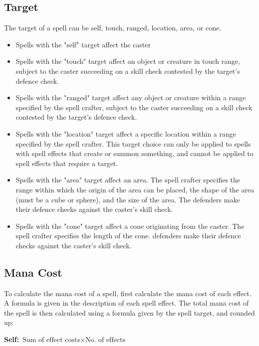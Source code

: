 \begin{multicols*}{2}
    \subsection{Target}
    The target of a spell can be self, touch, ranged, location, area, or cone.
    \begin{itemize}
        \item Spells with the "self" target affect the caster
        \item Spells with the "touch" target affect an object or creature in
            touch range, subject to the caster succeeding on a skill check
            contested by the target's defence check.
        \item Spells with the "ranged" target affect any object or creature
            within a range specified by the spell crafter, subject to the caster
            succeeding on a skill check contested by the target's defence check.
        \item Spells with the "location" target affect a specific location
            within a range specified by the spell crafter.
            This target choice can only be applied to spells with spell effects
            that create or summon something, and cannot be applied to spell
            effects that require a target.
        \item Spells with the "area" target affect an area. The spell crafter
            specifies the range within which the origin of the area can be
            placed, the shape of the area (must be a cube or sphere), and the
            size of the area. The defenders make their defence checks against
            the caster's skill check.
        \item Spells with the "cone" target affect a cone originating from
            the caster. The spell crafter specifies the length of the cone.
            defenders make their defence checks against the caster's skill
            check.
    \end{itemize}

    \subsection{Mana Cost}
    To calculate the mana cost of a spell, first calculate the mana cost of
    each effect. A formula is given in the description of each spell effect.
    The total mana cost of the spell is then calculated using a formula given
    by the spell target, and rounded up:
    
    \noindent
    \textbf{Self:} $\text{Sum of effect costs} \times \text{No. of effects}$


\end{multicols*}
